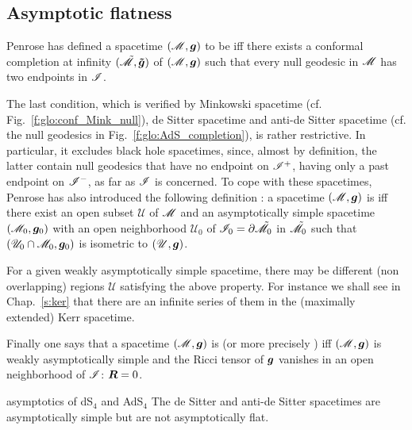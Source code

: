 \subsection{Asymptotic flatness} \label{s:glo:asymp_flat}

Penrose \cite{Penro64,Penro68} has defined
a spacetime $(\mathscr{M},\bm{g})$ to be  iff there exists
a conformal completion at infinity $(\tilde{\mathscr{M}},\bm{\tilde{g}})$
of $(\mathscr{M},\bm{g})$
such that every null geodesic in $\mathscr{M}$ has two endpoints in $\mathscr{I}$.

The last condition, which is verified by Minkowski spacetime (cf. Fig.~\ref{f:glo:conf_Mink_null}),
de Sitter spacetime and anti-de Sitter spacetime (cf. the null geodesics in
Fig.~\ref{f:glo:AdS_completion}), is rather restrictive. In particular, it excludes
black hole spacetimes, since, almost by definition, the latter contain null
geodesics that have no endpoint on $\mathscr{I}^+$, having only a past endpoint
on $\mathscr{I}^-$, as far as $\mathscr{I}$ is concerned. To cope with these spacetimes,
Penrose has also introduced the following definition \cite{Penro68}:
a spacetime $(\mathscr{M},\bm{g})$ is
 iff
there exist an open subset $\mathscr{U}$ of $\mathscr{M}$ and
an asymptotically simple spacetime $(\mathscr{M}_0, \bm{g}_0)$
with an open neighborhood $\mathscr{U}_0$ of $\mathscr{I}_0 = \partial \tilde{\mathscr{M}}_0$
in $\tilde{\mathscr{M}}_0$ such that $(\mathscr{U}_0\cap \mathscr{M}_0,\bm{g}_0)$ is
isometric to $(\mathscr{U},\bm{g})$.

\begin{remark}
For a given weakly asymptotically simple spacetime, there may be different
(non overlapping) regions $\mathscr{U}$ satisfying the above property.
For instance we shall see in Chap.~\ref{s:ker}
that there are an infinite series of them in the (maximally extended) Kerr spacetime.
\end{remark}

Finally one says that a spacetime $(\mathscr{M},\bm{g})$ is
(or more precisely  \cite{HawkiE73})
iff $(\mathscr{M},\bm{g})$ is weakly asymptotically simple and the Ricci tensor of
$\bm{g}$ vanishes in an open neighborhood of $\mathscr{I}$: $\bm{R} = 0$.

\begin{texample}{asymptotics of dS$_4$ and AdS$_4$}{}
The de Sitter and anti-de Sitter spacetimes are asymptotically simple but
are not asymptotically flat.
\end{texample}

